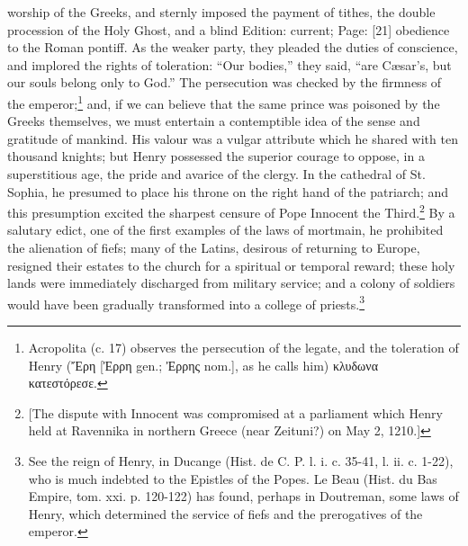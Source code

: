 worship of the Greeks, and sternly imposed the payment of tithes, the double procession of the Holy Ghost, and a blind Edition: current; Page: [21] obedience to the Roman pontiff. As the weaker party, they pleaded the duties of conscience, and implored the rights of toleration: \texthebrew{“}Our bodies,\texthebrew{}” they said, \texthebrew{“}are Cæsar\texthebrew{}’s, but our souls belong only to God.\texthebrew{}” The persecution was checked by the firmness of the emperor;\footnote{Acropolita (c. 17) observes the persecution of the legate, and the toleration of Henry (\textgreek{\texthebrew{Ἔ}ρη} [\textgreek{\texthebrew{Ἐ}ρρη} gen.; \textgreek{\texthebrew{Ἐ}ρρης} nom.], as he calls him) \textgreek{κλυδωνα κατεστόρεσε}.} and, if we can believe that the same prince was poisoned by the Greeks themselves, we must entertain a contemptible idea of the sense and gratitude of mankind. His valour was a vulgar attribute which he shared with ten thousand knights; but Henry possessed the superior courage to oppose, in a superstitious age, the pride and avarice of the clergy. In the cathedral of St. Sophia, he presumed to place his throne on the right hand of the patriarch; and this presumption excited the sharpest censure of Pope Innocent the Third.\footnote{[The dispute with Innocent was compromised at a parliament which Henry held at Ravennika in northern Greece (near Zeituni?) on May 2, 1210.]} By a salutary edict, one of the first examples of the laws of mortmain, he prohibited the alienation of fiefs; many of the Latins, desirous of returning to Europe, resigned their estates to the church for a spiritual or temporal reward; these holy lands were immediately discharged from military service; and a colony of soldiers would have been gradually transformed into a college of priests.\footnote{See the reign of Henry, in Ducange (Hist. de C. P. l. i. c. 35-41, l. ii. c. 1-22), who is much indebted to the Epistles of the Popes. Le Beau (Hist. du Bas Empire, tom. xxi. p. 120-122) has found, perhaps in Doutreman, some laws of Henry, which determined the service of fiefs and the prerogatives of the emperor.}

